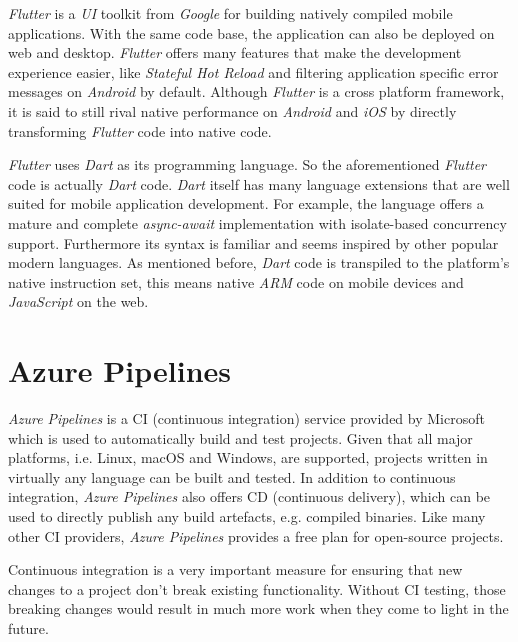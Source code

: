 \textit{Flutter} is a \textit{UI} toolkit from \textit{Google} for building natively compiled mobile
applications. With the same code base, the application can also be deployed on web and desktop.
\textit{Flutter} offers many features that make the development experience easier, like
\textit{Stateful Hot Reload} and filtering application specific error messages on \textit{Android}
by default. Although \textit{Flutter} is a cross platform framework, it is said to still rival
native performance on \textit{Android} and \textit{iOS} by directly transforming \textit{Flutter}
code into native code.
\cite{flutter}

\textit{Flutter} uses \textit{Dart} as its programming language. So the aforementioned \textit{Flutter}
code is actually \textit{Dart} code. \textit{Dart} itself has many language extensions that are well
suited for mobile application development. For example, the language offers a mature and complete
\textit{async-await} implementation with isolate-based concurrency support. Furthermore its syntax
is familiar and seems inspired by other popular modern languages. As mentioned before, \textit{Dart}
code is transpiled to the platform's native instruction set, this means native \textit{ARM} code on
mobile devices and \textit{JavaScript} on the web. \cite{dart}

\section{Azure Pipelines}

\textit{Azure Pipelines} is a CI (continuous integration) service provided by Microsoft which is
used to automatically build and test projects. Given that all major platforms, i.e. Linux, macOS and
Windows, are supported, projects written in virtually any language can be built and tested. In
addition to continuous integration, \textit{Azure Pipelines} also offers CD (continuous delivery),
which can be used to directly publish any build artefacts, e.g. compiled binaries. Like many other
CI providers, \textit{Azure Pipelines} provides a free plan for open-source projects.
\cite{azure-pipelines}

Continuous integration is a very important measure for ensuring that new changes to a project don't
break existing functionality. Without CI testing, those breaking changes would result in much more
work when they come to light in the future.
